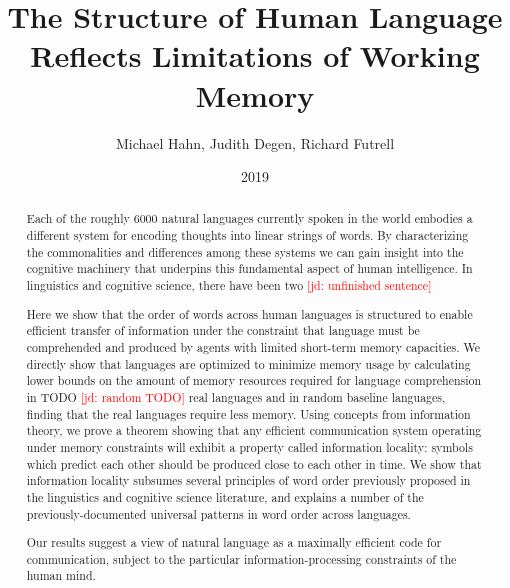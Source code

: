 \documentclass[12pt]{article}
\title{The Structure of Human Language Reflects Limitations of Working Memory}
\author{Michael Hahn, Judith Degen, Richard Futrell}
\date{2019}
\date{}
\newcounter{theorem}
\newcommand{\jd}[1]{\textcolor{Red}{[jd: #1]}}
\begin{document}
\baselineskip24pt


\maketitle

\begin{abstract}
  Each of the roughly 6000 natural languages currently spoken in the world embodies a different system for encoding thoughts into linear strings of words.
  By characterizing the commonalities and differences among these systems we can gain insight into the cognitive machinery that underpins this fundamental aspect of human intelligence. 
  In linguistics and cognitive science, there have been two \jd{unfinished sentence}

  Here we show that the order of words across human languages is structured to enable efficient transfer of information under the constraint that language must be comprehended and produced by agents with limited short-term memory capacities.
  We directly show that languages are optimized to minimize memory usage by calculating lower bounds on the amount of memory resources required for language comprehension in TODO \jd{random TODO} real languages and in random baseline languages, finding that the real languages require less memory.
  Using concepts from information theory, we prove a theorem showing that any efficient communication system operating under memory constraints will exhibit a property called information locality: symbols which predict each other should be produced close to each other in time.
  We show that information locality subsumes several principles of word order previously proposed in the linguistics and cognitive science literature, and explains a number of the previously-documented universal patterns in word order across languages.    
  
  Our results suggest a view of natural language as a maximally efficient code for communication, subject to the particular information-processing constraints of the human mind. 
\end{abstract}
\end{document}
